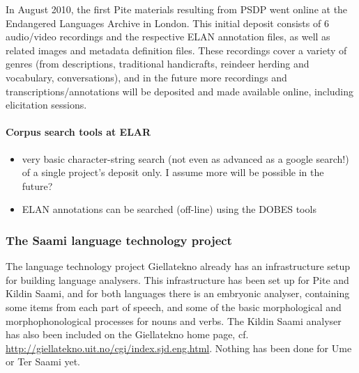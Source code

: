 \documentclass[a4paper,12pt]{article}
\begin{document}
In August 2010, the first Pite materials resulting from PSDP went online at the Endangered Languages Archive in London. This initial deposit consists of 6 audio/video recordings and the respective ELAN annotation files, as well as related images and metadata definition files. These recordings cover a variety of genres (from descriptions, traditional handicrafts, reindeer herding and vocabulary, conversations), and in the future more recordings and transcriptions/annotations will be deposited and made available online, including elicitation sessions.

\paragraph{Corpus search tools at ELAR} 
\begin{itemize}
\item very basic character-string search (not even as advanced as a google search!) of a single project's deposit only. I assume more will be possible in the future?
\item ELAN annotations can be searched (off-line) using the DOBES tools
\end{itemize}

\subsubsection{The Saami language technology project}

The language technology project Giellatekno already has an infrastructure setup for building language analysers. This infrastructure has been set up for Pite and Kildin Saami, and for both languages there is an embryonic analyser, containing some items from each part of speech, and some of the basic morphological and morphophonological processes for nouns and verbs. The Kildin Saami analyser has also been included on the Giellatekno home page, cf. \url{http://giellatekno.uit.no/cgi/index.sjd.eng.html}.  Nothing has been done for Ume or Ter Saami yet.
\end{document}
